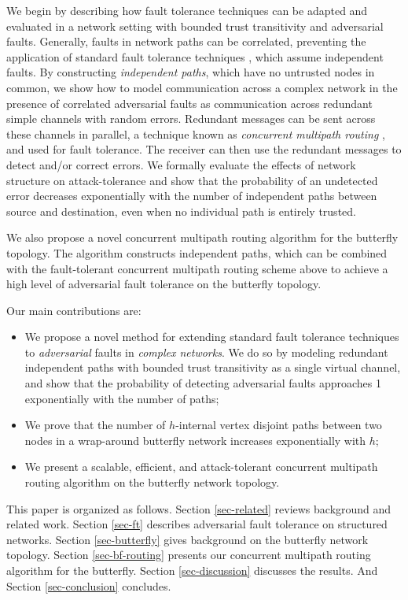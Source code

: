 \documentclass[sigconf]{acmart}
\begin{document}
We begin by describing how fault tolerance techniques can be adapted and
evaluated in a network setting with bounded trust transitivity and
adversarial faults.
Generally, faults in network paths can be correlated,
preventing the application of standard fault tolerance techniques
\cite{avizienis_basic_2004, von_neumann_probabilistic_1956},
which assume independent faults.
By constructing {\em independent paths},
which have no untrusted nodes in common,
we show how to model communication across a complex network in the presence
of correlated adversarial faults as communication across redundant
simple channels with random errors.
Redundant messages can be sent across these channels in parallel,
a technique known as {\em concurrent multipath routing}
\cite{zin_survey_2015, qadir_exploiting_2015, khiani_comparative_2013},
and used for fault tolerance.
The receiver can then use the redundant messages to detect and/or correct
errors.
We formally evaluate the
effects of network structure on attack-tolerance and show that the probability
of an undetected error decreases exponentially with the number of
independent paths between source and destination,
even when no individual path is entirely trusted.

We also propose a novel concurrent multipath routing algorithm for the butterfly
topology.
The algorithm constructs independent paths,
which can be combined with the fault-tolerant concurrent multipath routing
scheme above to
achieve a high level of adversarial fault tolerance on the butterfly topology.

Our main contributions are:
\begin{itemize}
\item{
We propose a novel method for extending standard fault tolerance techniques to
{\em adversarial} faults in {\em complex networks}.
We do so by modeling redundant independent paths
with bounded trust transitivity as a single virtual channel,
and show that the probability of detecting adversarial faults
approaches 1 exponentially with the number of paths;
}
\item{We prove that the number of $h$-internal vertex disjoint
paths between two nodes in a wrap-around butterfly network
increases exponentially with $h$;
}
\item{We present a scalable, efficient, and attack-tolerant concurrent
multipath routing algorithm on the butterfly network topology.}
\end{itemize}

This paper is organized as follows.
Section \ref{sec-related} reviews background and related work.
Section \ref{sec-ft} describes adversarial fault tolerance on
structured networks.
Section \ref{sec-butterfly} gives background on the butterfly network topology.
Section \ref{sec-bf-routing} presents our concurrent multipath routing
algorithm for the butterfly.
Section \ref{sec-discussion} discusses the results.
And Section \ref{sec-conclusion} concludes.
\end{document}
